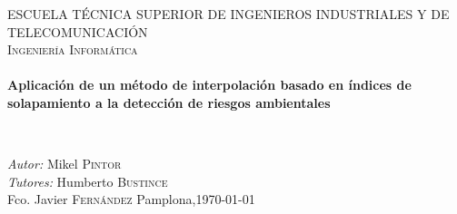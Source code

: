 \begin{titlepage}
\begin{center}
\textsc{\LARGE ESCUELA TÉCNICA SUPERIOR DE INGENIEROS INDUSTRIALES Y DE TELECOMUNICACIÓN}\\[1.5cm]

\textsc{\Large Ingeniería Informática}\\[0.5cm]

\HRule \\[0.4cm]
{ \huge \bfseries Aplicación de un método de interpolación basado en índices de solapamiento a la detección de riesgos ambientales\\[0.4cm] }

\HRule \\[1.5cm]

\vfill
\hfill
\begin{minipage}{0.4\textwidth}
\begin{flushright} \large
\emph{Autor:} Mikel \textsc{Pintor}\\
\emph{Tutores:} Humberto \textsc{Bustince}\\
Fco. Javier \textsc{Fernández}
{\large Pamplona,\today}
\end{flushright}
\end{minipage}
\vfill

\end{center}
\end{titlepage}